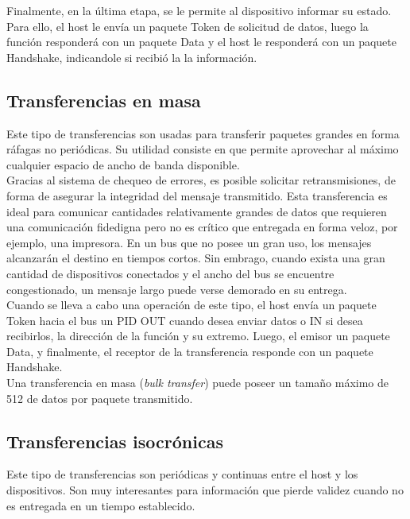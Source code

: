 	Finalmente, en la última etapa, se le permite al dispositivo informar su estado. Para ello, el host le envía un paquete Token de solicitud de datos, luego la función responderá con un paquete Data y el host le responderá con un paquete Handshake, indicandole si recibió la la información.\\
	
\subsection{Transferencias en masa}
	Este tipo de transferencias son usadas para transferir paquetes grandes en forma ráfagas no periódicas. Su utilidad consiste en que permite aprovechar al máximo cualquier espacio de ancho de banda disponible.\\
	
	Gracias al sistema de chequeo de errores, es posible solicitar retransmisiones, de forma de asegurar la integridad del mensaje transmitido. Esta transferencia es ideal para comunicar cantidades relativamente grandes de datos que requieren una comunicación fidedigna pero no es crítico que entregada en forma veloz, por ejemplo, una impresora. En un bus que no posee un gran uso, los mensajes alcanzarán el destino en tiempos cortos. Sin embrago, cuando exista una gran cantidad de dispositivos conectados y el ancho del bus se encuentre congestionado, un mensaje largo puede verse demorado en su entrega.\\

	Cuando se lleva a cabo una operación de este tipo, el host envía un paquete Token hacia el bus un PID OUT cuando desea enviar datos o IN si desea recibirlos, la dirección de la función y su extremo. Luego, el emisor un paquete Data, y finalmente, el receptor de la transferencia responde con un paquete Handshake.\\
	
	Una transferencia en masa ({\it bulk transfer}) puede poseer un tamaño máximo de \SI{512}{\byte} de datos por paquete transmitido.\\
	
\subsection{Transferencias isocrónicas}
	Este tipo de transferencias son periódicas y continuas entre el host y los dispositivos. Son muy interesantes para información que pierde validez cuando no es entregada en un tiempo establecido.\\
	
